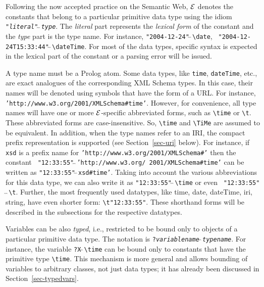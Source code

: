 \documentclass[11pt]{article}
\newcommand{\ERGO}{\mbox{\ensuremath{\cal{E}}\smaller{{\sc{RGO}}}}\xspace}
\newcommand{\FLSYSTEM}{\ERGO}
\newcommand{\bs}{\textbackslash}
\begin{document}
Following the now accepted practice on the Semantic Web, \FLSYSTEM denotes the
constants that belong to a particular primitive data type using the idiom
{\tt "\emph{literal}"$\widehat{~}\widehat{~}$\emph{type}}. The \emph{literal} part
represents the \emph{lexical form} 
of the constant and the \emph{type} part is the
type name. For instance, {\tt "2004-12-24"$\widehat{~}\widehat{~}$\bs{}date}, {\tt
  "2004-12-24T15:33:44"$\widehat{~}\widehat{~}$\bs{}dateTime}.
For most of the data types, specific syntax is expected in the lexical part
of the constant or a parsing error will be issued.

A type name must be a Prolog atom.
Some data types, like \texttt{time},  \texttt{dateTime},  etc., are exact analogues of the
corresponding XML Schema types. In this case, their names will be denoted
using symbols that have the form of a URL. For instance,
{\tt 'http://www.w3.org/2001/XMLSchema\#time'}.  However, for convenience,
all type names will have one or more \FLSYSTEM-specific abbreviated forms, such as
{\tt \bs{}time} or {\tt \bs{}t}. These abbreviated forms are
case-insensitive. So, {\tt \bs{}time} and
{\tt \bs{}TiMe} are assumed to be equivalent. In addition, when the type
names refer to an IRI, the compact prefix representation is supported (see
Section~\ref{sec-uri} below). For
instance, if {\tt xsd}  is a prefix name for
{\tt 'http://www.w3.org/2001/XMLSchema\#'} 
then the constant {\tt
  "12:33:55"$\widehat{~}\widehat{~}$'http://www.w3.org/ 2001/XMLSchema\#time'}  can be written as
{\tt "12:33:55"$\widehat{~}\widehat{~}$xsd\#time'}. Taking into account the
various abbreviations for this data type, we can also write it as
{\tt "12:33:55"$\widehat{~}\widehat{~}$\bs{}time} or even {\tt
  "12:33:55"$\widehat{~}\widehat{~}$\bs{}t}.
Further, the most frequently used datatypes, like time, date, dateTime, iri,
string,
have even shorter form:
\verb|\t"12:33:55"|.
These shorthand forms will be described in the subsections
for the respective datatypes.

Variables can be also \emph{typed}, i.e., restricted to be bound only to 
objects of a particular primitive data type.
The notation is {\tt ?\emph{variablename}$\hat{~}\hat{~}$\emph{typename}}. 
For instance, the variable {\tt ?X$\hat{~}\hat{~}$\bs{}time}  
can be bound only to constants that have the primitive type {\tt \bs{}time}. 
This mechanism is more general and allows bounding of variables to
arbitrary classes, not just data types; it has already been discussed in
Section~\ref{sec-typedvars}.
\end{document}
